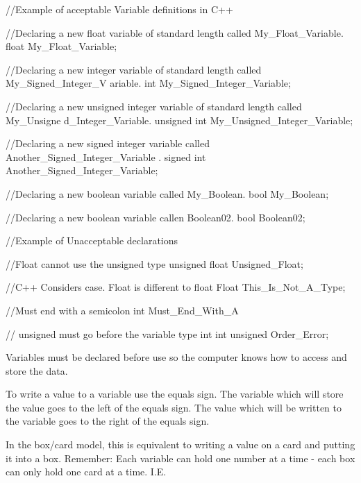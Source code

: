 \begin{DoxyCode}
 //Example of acceptable Variable definitions in C++

 //Declaring a new float variable of standard length called My_Float_Variable.
 float My_Float_Variable;

 //Declaring a new integer variable of standard length called My_Signed_Integer_V
      ariable.
 int My_Signed_Integer_Variable;

 //Declaring a new unsigned integer variable of standard length called My_Unsigne
      d_Integer_Variable.
 unsigned int My_Unsigned_Integer_Variable;

 //Declaring a new signed integer variable called Another_Signed_Integer_Variable
      .
 signed int Another_Signed_Integer_Variable;

 //Declaring a new boolean variable called My_Boolean.
 bool My_Boolean;

 //Declaring a new boolean variable callen Boolean02.
 bool Boolean02;


 //Example of Unacceptable declarations

 //Float cannot use the unsigned type
 unsigned float Unsigned_Float;

 //C++ Considers case. Float is different to float
 Float This_Is_Not_A_Type;

 //Must end with a semicolon
 int Must_End_With_A

 // unsigned must go before the variable type int
 int unsigned Order_Error;
\end{DoxyCode}


Variables must be declared before use so the computer knows how to access and store the data. \par


To write a value to a variable use the equals sign. The variable which will store the value goes to the left of the equals sign. The value which will be written to the variable goes to the right of the equals sign. \par
 In the box/card model, this is equivalent to writing a value on a card and putting it into a box. Remember: Each variable can hold one number at a time -\/ each box can only hold one card at a time. I.E. \par
 
